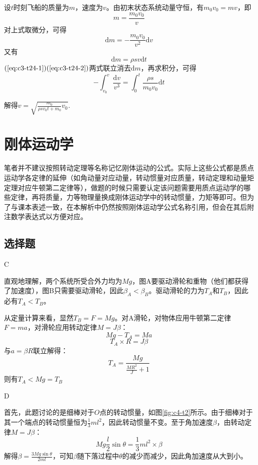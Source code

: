 \documentclass[b5paper,opensource,sourcefont,parskip]{qyxf-book}
\newcommand{\di}[1]{\mathrm{d}#1}
\begin{document}
\solve 设$t$时刻飞船的质量为$m$，速度为$v$。由初末状态系统动量守恒，有$m_0 v_0=mv$，即
\begin{equation}
m=\frac{m_0 v_0}{v}
\end{equation}
对上式取微分，可得
\begin{equation}\label{eq:c3-t24-1}
\di m=- \frac{m_0 v_0}{v^2} \di v
\end{equation}
又有
\begin{equation}\label{eq:c3-t24-2}
\di m=\rho sv\di t
\end{equation}
$(\ref{eq:c3-t24-1})(\ref{eq:c3-t24-2})$两式联立消去$\di m$，再求积分，可得
\begin{equation*}
-\int_{v_0}^v \frac{\di v}{v^3}=\int_0^t \frac{\rho s}{m_0 v_0} \di t
\end{equation*}

解得$v=\sqrt{\frac{m_0}{\rho sv_0 t+m_0}v_0}$.


\chapter{刚体运动学}
\note 笔者并不建议按照转动定理等名称记忆刚体运动的公式。实际上这些公式都是质点运动学各定律的延伸（如角动量对应动量，转动惯量对应质量，转动定理和动量矩定理对应牛顿第二定律等），做题的时候只需要认定该问题需要用质点运动学的哪些定律，再将质量，力等物理量换成刚体运动学中的转动惯量，力矩等即可。但为了与课本表述一致，在本解析中仍然按照刚体运动学公式名称引用，但会在其后附注数学表达式以方便对应。

\section{选择题}
C

\solve 直观地理解，两个系统所受合外力均为$ Mg $，图A要驱动滑轮和重物（他们都获得了加速度），图B只需要驱动滑轮，因此$ \beta_A<\beta_B $。驱动滑轮的力为$ T_A $和$ T_B $，因此必有$ T_A<T_B $。

从定量计算来看，显然$ T_B=F=Mg $。对A滑轮，对物体应用牛顿第二定律$F=ma$，对滑轮应用转动定律$M=J\beta$：
\[Mg-T_A=Ma\]
			\[T_A\times R=J\beta\]
与$ a=\beta R $联立解得：
\[T_A=\frac{Mg}{\frac{MR^2}{J}+1}\]
则有$ T_A< Mg=T_B$

D

\solve 首先，此题讨论的是细棒对于$ O $点的转动惯量，如图\ref{fig:c4-t2}所示。由于细棒对于其一个端点的转动惯量恒为$ \frac{1}{3}ml^2 $，因此转动惯量不变。至于角加速度$ \beta $，由转动定律$M=J\beta$：
\[Mg\frac{l}{2}\sin\theta=\frac{1}{3}ml^2\times\beta\]
解得$ \beta=\frac{3Mg\sin\theta}{2ml} $，可知$ \beta $随下落过程中$ \theta $的减少而减少，因此角加速度从大到小。
\end{document}
